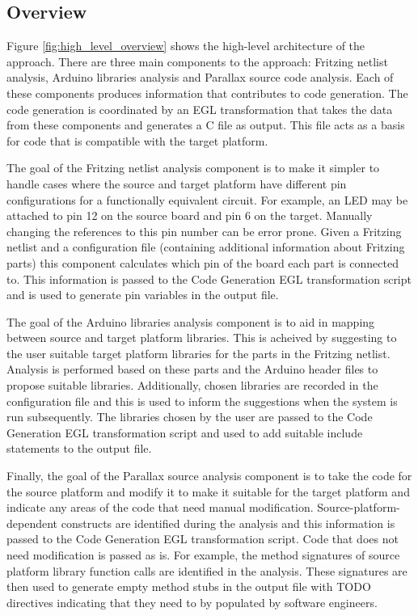 \documentclass{UoYCSproject}
\begin{document}
\subsection{Overview}
Figure \ref{fig:high_level_overview} shows the high-level architecture of the approach. There are three main components to the approach: Fritzing netlist analysis, Arduino libraries analysis and Parallax source code analysis. Each of these components produces information that contributes to code generation. The code generation is coordinated by an EGL transformation that takes the data from these components and generates a C file as output. This file acts as a basis for code that is compatible with the target platform. 

The goal of the Fritzing netlist analysis component is to make it simpler to handle cases where the source and target platform have different pin configurations for a functionally equivalent circuit. For example, an LED may be attached to pin 12 on the source board and pin 6 on the target. Manually changing the references to this pin number can be error prone. Given a Fritzing netlist and a configuration file (containing additional information about Fritzing parts) this component calculates which pin of the board each part is connected to. This information is passed to the Code Generation EGL transformation script and is used to generate pin variables in the output file.

The goal of the Arduino libraries analysis component is to aid in mapping between source and target platform libraries. This is acheived by suggesting to the user suitable target platform libraries for the parts in the Fritzing netlist. Analysis is performed based on these parts and the Arduino header files to propose suitable libraries. Additionally, chosen libraries are recorded in the configuration file and this is used to inform the suggestions when the system is run subsequently. The libraries chosen by the user are passed to the Code Generation EGL transformation script and used to add suitable include statements to the output file.

Finally, the goal of the Parallax source analysis component is to take the code for the source platform and modify it to make it suitable for the target platform and indicate any areas of the code that need manual modification. Source-platform-dependent constructs are identified during the analysis and this information is passed to the Code Generation EGL transformation script. Code that does not need modification is passed as is. For example, the method signatures of source platform library function calls are identified in the analysis. These signatures are then used to generate empty method stubs in the output file with TODO directives indicating that they need to by populated by software engineers.
\end{document}
